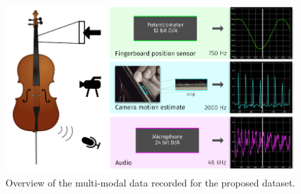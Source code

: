 \begin{figure}[h]
  \centering
  \includegraphics[width=\textwidth]{Chapters/04_Data/figures/teaser.pdf}
  \caption{Overview of the multi-modal data recorded for the proposed dataset.}
\label{fig:teaser_hdf0}
\end{figure}

